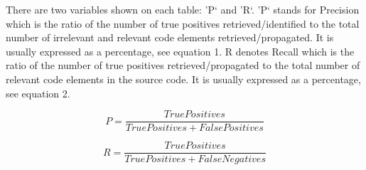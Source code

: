 






 
There are two variables shown on each table: 'P` and 'R`. 'P` stands for Precision which is the ratio of the number of true positives retrieved/identified to the total number of irrelevant and relevant code elements retrieved/propagated. It is usually expressed as a percentage, see equation 1. R denotes Recall which is the ratio of the number of true positives retrieved/propagated to the total number of relevant code elements in the
source code. It is usually expressed as a percentage, see equation 2. 

\begin{equation}
P=\frac{True Positives}{True Positives + False Positives}
\end{equation}

\begin{equation}
R=\frac{True Positives}{True Positives + False Negatives}
\end{equation}

